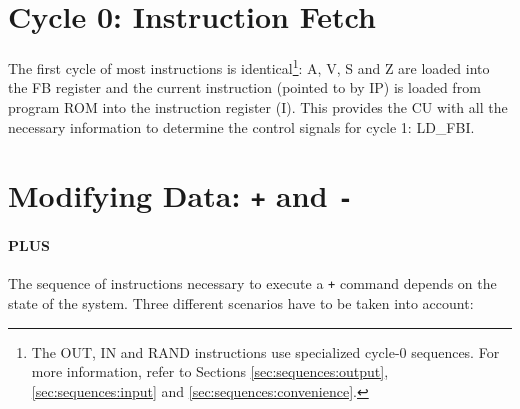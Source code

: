 \section{Cycle 0: Instruction Fetch}
The first cycle of most instructions is identical\footnote{The OUT, IN and RAND instructions use specialized cycle-0 sequences. For more information, refer to Sections \ref{sec:sequences:output}, \ref{sec:sequences:input} and \ref{sec:sequences:convenience}.}: A, V, S and Z are loaded into the FB register and the current instruction (pointed to by IP) is loaded from program ROM into the instruction register (I). This provides the CU with all the necessary information to determine the control signals for cycle 1: LD\_FBI.

\section{Modifying Data: \texttt{+} and \texttt{-}} \label{sec:sequences:+-}
\paragraph{PLUS} The sequence of instructions necessary to execute a \texttt{+} command depends on the state of the system. Three different scenarios have to be taken into account:

